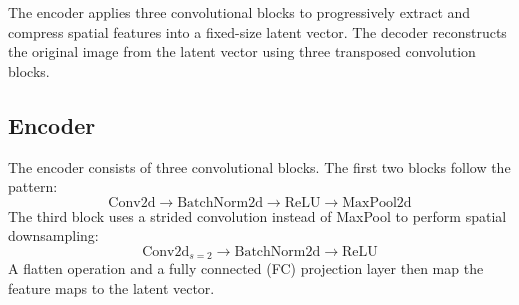 \documentclass[12pt,a4paper]{article}
\begin{document}
The encoder applies three convolutional blocks to progressively extract and compress spatial features into a fixed-size latent vector. The decoder reconstructs the original image from the latent vector using three transposed convolution blocks.

\subsection{Encoder}

The encoder consists of three convolutional blocks. The first two blocks follow the pattern:
\[
\text{Conv2d} \rightarrow \text{BatchNorm2d} \rightarrow \text{ReLU} \rightarrow \text{MaxPool2d}
\]
The third block uses a strided convolution instead of MaxPool to perform spatial downsampling:
\[
\text{Conv2d}_{s=2} \rightarrow \text{BatchNorm2d} \rightarrow \text{ReLU}
\]
A flatten operation and a fully connected (FC) projection layer then map the feature maps to the latent vector.

\begin{table}[H]
  \centering
  \caption{Encoder Architecture}
  \label{tab:encoder}
  \renewcommand{\arraystretch}{1.35}
\end{table}
\end{document}

